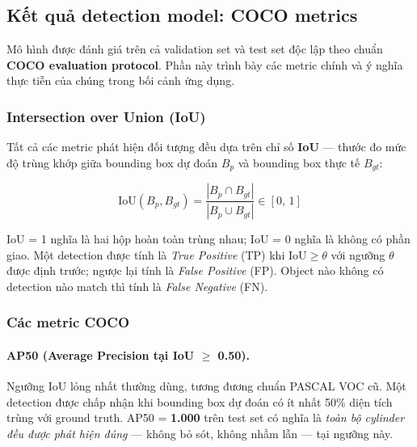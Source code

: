 
\subsection{Kết quả detection model: COCO metrics}
\label{subsec:ai3-coco}

Mô hình được đánh giá trên cả validation set và test set độc lập
theo chuẩn \textbf{COCO evaluation protocol}. Phần này trình bày
các metric chính và ý nghĩa thực tiễn của chúng trong bối cảnh
ứng dụng.

\subsubsection*{Intersection over Union (IoU)}

Tất cả các metric phát hiện đối tượng đều dựa trên chỉ số
\textbf{IoU} --- thước đo mức độ trùng khớp giữa bounding box
dự đoán $B_p$ và bounding box thực tế $B_{gt}$:

\[
  \text{IoU}(B_p, B_{gt})
  = \frac{|B_p \cap B_{gt}|}{|B_p \cup B_{gt}|}
  \in [0,\,1]
\]

IoU = 1 nghĩa là hai hộp hoàn toàn trùng nhau; IoU = 0 nghĩa là
không có phần giao. Một detection được tính là
\textit{True Positive} (TP) khi $\text{IoU} \geq \theta$ với ngưỡng
$\theta$ được định trước; ngược lại tính là \textit{False Positive}
(FP). Object nào không có detection nào match thì tính là
\textit{False Negative} (FN).

\subsubsection*{Các metric COCO}

\paragraph{AP50 (Average Precision tại IoU $\geq$ 0.50).}
Ngưỡng IoU lỏng nhất thường dùng, tương đương chuẩn PASCAL VOC
cũ. Một detection được chấp nhận khi bounding box dự đoán có ít
nhất 50\% diện tích trùng với ground truth. AP50 = \textbf{1.000}
trên test set có nghĩa là \textit{toàn bộ cylinder đều được phát
hiện đúng} --- không bỏ sót, không nhầm lẫn --- tại ngưỡng này.


